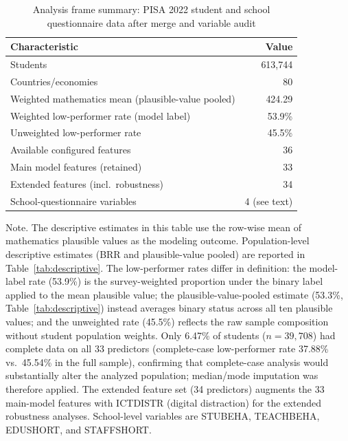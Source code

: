 \begin{table}[htp]
\centering
\small
\caption{Analysis frame summary: PISA 2022 student and school questionnaire data after merge and variable audit\label{tab:sample}}
\begin{tabular}{@{}lr@{}}
\toprule
\textbf{Characteristic} & \textbf{Value} \\
\midrule
  Students & 613,744 \\
  Countries/economies & 80 \\
  Weighted mathematics mean (plausible-value pooled) & 424.29 \\
  Weighted low-performer rate (model label) & 53.9\% \\
  Unweighted low-performer rate & 45.5\% \\
  Available configured features & 36 \\
  Main model features (retained) & 33 \\
  Extended features (incl.\ robustness) & 34 \\
  School-questionnaire variables & 4 (see text) \\
\bottomrule
\end{tabular}
\begin{tablenotes}
\item Note. The descriptive estimates in this table use the row-wise mean of mathematics plausible values as the modeling outcome. Population-level descriptive estimates (BRR and plausible-value pooled) are reported in Table~\ref{tab:descriptive}. The low-performer rates differ in definition: the model-label rate (53.9\%) is the survey-weighted proportion under the binary label applied to the mean plausible value; the plausible-value-pooled estimate (53.3\%, Table~\ref{tab:descriptive}) instead averages binary status across all ten plausible values; and the unweighted rate (45.5\%) reflects the raw sample composition without student population weights. Only 6.47\% of students ($n = 39{,}708$) had complete data on all 33 predictors (complete-case low-performer rate 37.88\% vs.\ 45.54\% in the full sample), confirming that complete-case analysis would substantially alter the analyzed population; median/mode imputation was therefore applied. The extended feature set (34 predictors) augments the 33 main-model features with ICTDISTR (digital distraction) for the extended robustness analyses. School-level variables are STUBEHA, TEACHBEHA, EDUSHORT, and STAFFSHORT.
\end{tablenotes}
\end{table}
